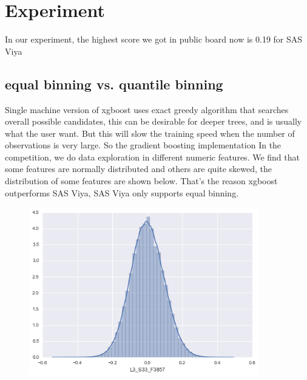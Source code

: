 \documentclass{article}
\begin{document}

\section{Experiment}
In our experiment, the highest score we got in public board now is 0.19 for SAS Viya
\subsection{equal binning vs. quantile binning}

Single machine version of xgboost uses exact greedy algorithm that searches overall possible candidates, this can be desirable for deeper trees, and is usually what the user want. But this will slow the training speed when the number of observations is very large. So the gradient boosting implementation In the competition, we do data exploration in different numeric features. We find that some features are normally distributed and others are quite skewed, the distribution of some features are shown below. That's the reason xgboost outperforms SAS Viya, SAS Viya only supports equal binning. 
\begin{figure}[h]
\includegraphics[width=10cm]{L3_S33_F3857.png}
\end{figure}
\end{document}
